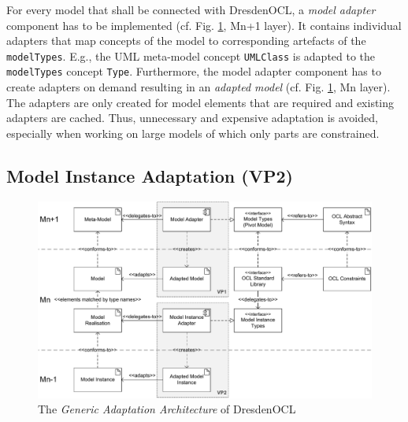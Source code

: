	For every model that shall be connected with DresdenOCL, 
	a \emph{model adapter} component has to be implemented (cf. Fig. \ref{fig:modeladaptation}, Mn+1 layer). 
	It contains individual adapters that map concepts of the model to corresponding artefacts of the \texttt{modelTypes}. E.g., the UML
	meta-model concept \texttt{UMLClass} is adapted to the \texttt{modelTypes} concept
	\texttt{Type}. 
	Furthermore, the model adapter component has to create 
	adapters on demand resulting in an \textit{adapted model} (cf. Fig.
	\ref{fig:modeladaptation}, Mn layer).
	The adapters are only created for model elements that are required and
	existing adapters are cached. Thus, unnecessary and expensive adaptation is avoided, 
	especially when working on large models of which only parts are constrained.


\subsection{Model Instance Adaptation (VP2)}
	
		\begin{figure}[!t]
				\includegraphics[width=1.00\textwidth]{figures/modeladaptation.pdf}
			\caption{The \emph{Generic Adaptation Architecture} of DresdenOCL
			}
			\label{fig:modeladaptation}			
		\end{figure}
		
